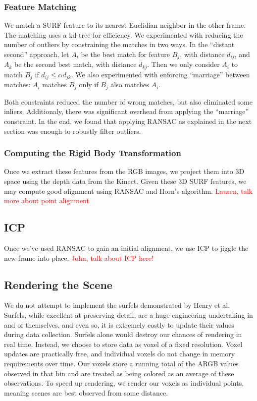 \documentclass[letterpaper, 10pt, conference]{ieeeconf}
\newcommand{\xxx}[1]{\textcolor{red}{#1}}
\begin{document}
\subsubsection{Feature Matching}
We match a SURF feature to its nearest Euclidian neighbor in the other frame. The matching
uses a kd-tree for efficiency. We experimented with reducing the number of outliers by
constraining the matches in two ways. In the ``distant second'' approach, let $A_i$ be the
best match for feature $B_j$, with distance $d_{ij}$, and $A_k$ be the second best match,
with distance $d_{kj}$. Then we only consider $A_i$ to match $B_j$ if $d_{ij} \le \alpha d_{jk}$.
We also experimented with enforcing ``marriage'' between matches: $A_i$ matches $B_j$ only if
$B_j$ also matches $A_i$.

Both constraints reduced the number of wrong matches, but also eliminated some inliers.
Additionaly, there was significant overhead from applying the ``marriage'' constraint.
In the end, we found that applying RANSAC as explained in the next section was enough
to robustly filter outliers.

\subsubsection{Computing the Rigid Body Transformation}
\label{ransac}
Once we extract these features from the RGB images, we project them into 3D space
using the depth data from the Kinect. Given these 3D SURF features, we may
compute good alignment using RANSAC and Horn's algorithm. \xxx{Lauren, talk
    more about point alignment}

\subsection{ICP}
Once we've used RANSAC to gain an initial alignment, we use ICP to jiggle the
new frame into place. \xxx{John, talk about ICP here!}

\subsection{Rendering the Scene}
We do not attempt to implement the surfels demonstrated by Henry et al.
Surfels, while excellent at preserving detail, are a huge engineering
undertaking in and of themselves, and even so, it is extremely costly to
update their values during data collection. Surfels alone would destroy our
chances of rendering in real time. Instead, we choose to store data as voxel
of a fixed resolution. Voxel updates are practically free, and individual
voxels do not change in memory requirements over time. Our voxels store a
running total of the ARGB values observed in that bin and are treated as
being colored as an average of these observations. To speed up rendering, we
render our voxels as individual points, meaning scenes are best observed from
some distance.
\end{document}
